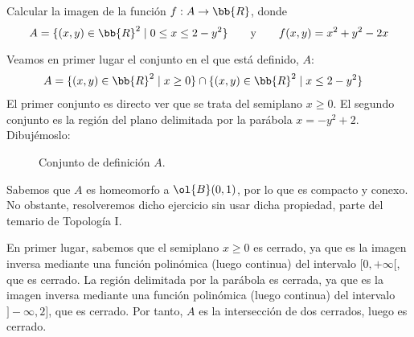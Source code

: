 \begin{ejercicio}
    Calcular la imagen de la función $f: A \to \bb{R}$, donde
    \begin{equation*}
        A = \{(x,y)\in \bb{R}^2\mid 0\leq x \leq 2-y^2\}
        \qquad \text{y} \qquad
        f(x,y)=x^2+y^2 -2x
    \end{equation*}

    Veamos en primer lugar el conjunto en el que está definido, $A$:
    \begin{align*}
        A &= \{(x,y)\in \bb{R}^2\mid x\geq 0\} \cap \{(x,y)\in \bb{R}^2\mid x\leq 2-y^2\}
    \end{align*}
    El primer conjunto es directo ver que se trata del semiplano $x\geq 0$. El segundo conjunto es
    la región del plano delimitada por la parábola $x=-y^2+2$. Dibujémoslo:
    \begin{figure}[H]
        \centering
        \caption{Conjunto de definición $A$.}
    \end{figure}

    Sabemos que $A$ es homeomorfo a $\ol{B}(0,1)$, por lo que es compacto y conexo.
    No obstante, resolveremos dicho ejercicio sin usar dicha propiedad, parte del temario de Topología I.

    En primer lugar, sabemos que el semiplano $x\geq 0$ es cerrado, ya que es la imagen inversa mediante una función polinómica (luego continua) del intervalo $[0,+\infty[$, que es cerrado.
    La región delimitada por la parábola es cerrada, ya que es la imagen inversa mediante una función polinómica (luego continua) del intervalo $]-\infty,2]$, que es cerrado.
    Por tanto, $A$ es la intersección de dos cerrados, luego es cerrado.
    

\end{ejercicio}
